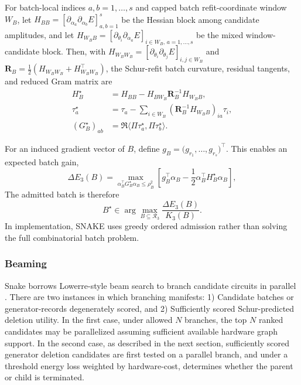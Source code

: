 \documentclass[
  reprint,
  amsmath,
  amssymb,
  aps,
  pra,
  nofootinbib,
  superscriptaddress,
  floatfix
]{revtex4-2}
\begin{document}
For batch-local indices \(a,b=1,\ldots,s\) and capped batch refit-coordinate window \(W_B\), let $H_{BB}=[\partial_{\alpha_a}\partial_{\alpha_b}E]_{a,b=1}^s$ be the Hessian block among candidate amplitudes, and let $H_{W_BB}=[\partial_{\theta_i}\partial_{\alpha_a}E]_{i\in W_B,\,a=1,\ldots,s}$ be the mixed window-candidate block. Then, with $H_{W_BW_B}=[\partial_{\theta_i}\partial_{\theta_j}E]_{i,j\in W_B}$ and $\mathbf R_B=\frac12(H_{W_BW_B}+H_{W_BW_B}^{\top})$, the Schur-refit batch curvature, residual tangents, and reduced Gram matrix are
\begin{equation}
\begin{aligned}
H_B^\star
&=
H_{BB}
-
H_{BW_B}\mathbf R_B^{-1}H_{W_BB},\\
\tau_a^\star
&=\tau_a-\sum_{i\in W_B}(\mathbf R_B^{-1}H_{W_BB})_{ia}\tau_i,\\
(G_B^\star)_{ab}
&=\Re\langle \Pi\tau_a^\star,\Pi\tau_b^\star\rangle .
\end{aligned}
\label{eq:batch_schur_curvature}
\end{equation}

For an induced gradient vector of $B$, define \(g_B=\big(g_{r_1},\ldots,g_{r_s}\big)^\top\). This enables an expected batch gain,
\begin{equation}
\Delta E_3(B)
=
\max_{\alpha_B^\top G_B^\star\alpha_B\le \rho_B^2}
\left[
g_B^\top\alpha_B
-
\frac12\alpha_B^\top H_B^\star\alpha_B
\right],
\label{eq:batch_expected_gain}
\end{equation}
The admitted batch is therefore
\begin{equation}
B^\star\in\arg\max_{B\subseteq\mathcal R_3}\frac{\Delta E_3(B)}{K_3(B)}.
\label{eq:batch_argmax}
\end{equation}
In implementation, SNAKE uses greedy ordered admission rather than solving the full combinatorial batch problem.

\subsubsection{Beaming}
Snake borrows Lowerre-style beam search to branch candidate circuits in parallel \cite{Lowerre1976Beam}.
There are two instances in which branching manifests: 1) Candidate batches or generator-records degenerately scored, and 2) Sufficiently scored Schur-predicted deletion utility. In the first case, under allowed $N$ branches, the top $N$ ranked candidates may be parallelized assuming sufficient available hardware graph support. In the second case, as described in the next section, sufficiently scored generator deletion candidates are first tested on a parallel branch, and under a threshold energy loss weighted by hardware-cost, determines whether the parent or child is terminated.
\end{document}

